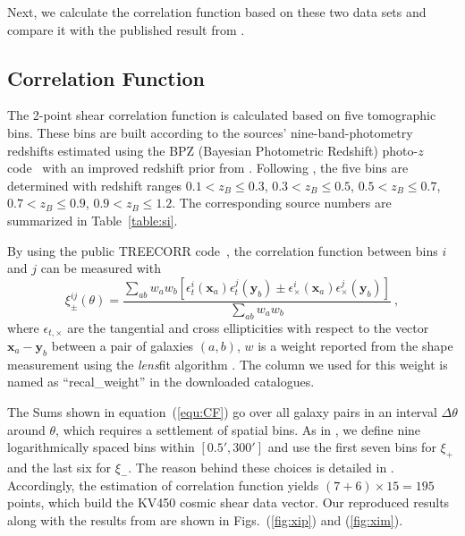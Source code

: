 \documentclass[fleqn,usenatbib]{mnras}
\begin{document}
Next, we calculate the correlation function based on these two data sets and compare it with the published result from \citet{2018arXiv181206076H}.

\subsection{Correlation Function}
The 2-point shear correlation function is calculated based on five tomographic bins. These bins are built according to the sources' nine-band-photometry redshifts estimated using the BPZ (Bayesian Photometric Redshift) photo-$z$ code~\citep{BPZ_2000ApJ,BPZ_2006AJ} with an improved redshift prior from \citet{BPZ_2014ApJ}. Following \citet{2018arXiv181206076H}, the five bins are determined with redshift ranges $0.1<z_B\leq 0.3$, $0.3<z_B\leq 0.5$, $0.5<z_B\leq 0.7$, $0.7<z_B\leq 0.9$, $0.9<z_B\leq 1.2$. The corresponding source numbers are summarized in Table~\ref{table:si}.

By using the public TREECORR code~\citep{TREECORR_2004MNRAS}, the correlation function between bins $i$ and $j$ can be measured with
\begin{equation}
\label{equ:CF}
    \xi^{ij}_{\pm}(\theta)=\frac{\sum_{ab}w_aw_b\left[\epsilon_t^i(\bm{x}_a)\epsilon_t^j(\bm{y}_b)\pm\epsilon_{\times}^i(\bm{x}_a)\epsilon_{\times}^j(\bm{y}_b)\right]}{\sum_{ab}w_aw_b}~,
\end{equation}
where $\epsilon_{t,\times}$ are the tangential and cross ellipticities with respect to the vector $\bm{x}_a-\bm{y}_b$ between a pair of galaxies $(a,b)$, $w$ is a weight reported from the shape measurement using the {\it lens}fit algorithm \citep{lensfit_2007MNRAS.382..315M,lensfit_2008MNRAS.390..149K,lensfit_2013MNRAS.429.2858M}. The column we used for this weight is named as ``recal\_weight'' in the downloaded catalogues.

The Sums shown in equation~(\ref{equ:CF}) go over all galaxy pairs in an interval $\Delta\theta$ around $\theta$, which requires a settlement of spatial bins. As in \citet{2018arXiv181206076H}, we define nine logarithmically spaced bins within $[0.5', 300']$ and use the first seven bins for $\xi_{+}$ and the last six for $\xi_{-}$. The reason behind these choices is detailed in \citet{2018arXiv181206076H}. Accordingly, the estimation of correlation function yields $(7+6)\times 15=195$ points, which build the KV450 cosmic shear data vector. Our reproduced results along with the results from \citet{2018arXiv181206076H} are shown in Figs.~(\ref{fig:xip}) and (\ref{fig:xim}).
\end{document}
